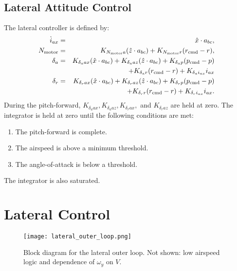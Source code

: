 \documentclass{article}
\newcommand{\rcmd}{r_{\textrm{cmd}}}
\newcommand{\pcmd}{p_\textrm{cmd}}
\newcommand{\rcmd}{r_\textrm{cmd}}
\newcommand{\Nmotor}{N_\textrm{motor}}
\begin{document}
\subsection{Lateral Attitude Control}
The lateral controller is defined by:
\begin{eqnarray}
\dot i_{ax} &=& \hat x \cdot a_{bc}, \\
\Nmotor &=& K_{\Nmotor a} (\hat z \cdot a_{bc}) + K_{\Nmotor r}(\rcmd - r), \\
\delta_a &=& K_{\delta_a ax} (\hat x \cdot a_{bc})
+ K_{\delta_a az} (\hat z \cdot a_{bc})
+ K_{\delta_a p}(\pcmd - p)\\
&&+ K_{\delta_a r}(\rcmd - r)
+ K_{\delta_a i_{ax}} i_{ax}\notag\\
\delta_r &=& K_{\delta_r ax} (\hat x \cdot a_{bc})
+ K_{\delta_r az} (\hat z \cdot a_{bc})
+ K_{\delta_r p}(\pcmd - p)\\
&&+ K_{\delta_r r}(\rcmd - r)
+ K_{\delta_r i_{ax}} i_{ax}.\notag
\end{eqnarray}
During the pitch-forward, $K_{\delta_a ax}, K_{\delta_a az},
K_{\delta_r ax},$ and $K_{\delta_r az}$ are held at zero.  The
integrator is held at zero until the following conditions are met:
\begin{enumerate}
\item The pitch-forward is complete.
\item The airspeed is above a minimum threshold.
\item The angle-of-attack is below a threshold.
\end{enumerate}
The integrator is also saturated.

\section{Lateral Control}
\begin{figure}
\centering
\texttt{[image: lateral\_outer\_loop.png]}
\caption{Block diagram for the lateral outer loop.  Not shown:
  low airspeed logic and dependence of $\omega_y$ on $V$.}
\end{figure}
\end{document}
